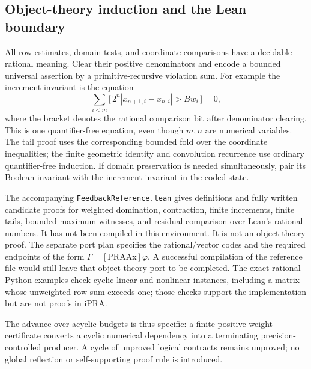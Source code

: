 \subsection{Object-theory induction and the Lean boundary}

All row estimates, domain tests, and coordinate comparisons have a decidable
rational meaning. Clear their positive denominators and encode a bounded
universal assertion by a primitive-recursive violation sum. For example the
increment invariant is the equation
\[
 \sum_{i<m}\bigl[\,2^n|x_{n+1,i}-x_{n,i}|>Bw_i\,\bigr]=0,
\]
where the bracket denotes the rational comparison bit after denominator
clearing. This is one quantifier-free equation, even though $m,n$ are numerical
variables. The tail proof uses the corresponding bounded fold over the
coordinate inequalities; the finite geometric identity and convolution
recurrence use ordinary quantifier-free induction. If domain preservation
is needed simultaneously, pair its Boolean invariant with the increment
invariant in the coded state.

The accompanying \nolinkurl{FeedbackReference.lean} gives definitions and
fully written candidate proofs for weighted domination, contraction, finite
increments, finite tails, bounded-maximum witnesses, and residual comparison
over Lean's rational numbers. It has not been compiled in this environment.
It is not an object-theory proof. The separate port plan specifies the
rational/vector codes and the required endpoints of the form
$\Gamma\vdash[\mathrm{PRAAx}]\varphi$. A successful compilation of the
reference file would still leave that object-theory port to be completed.
The exact-rational Python examples check cyclic linear and nonlinear
instances, including a matrix whose unweighted row sum exceeds one; those
checks support the implementation but are not proofs in iPRA.

The advance over acyclic budgets is thus specific: a finite positive-weight
certificate converts a cyclic numerical dependency into a terminating
precision-controlled producer. A cycle of unproved logical contracts remains
unproved; no global reflection or self-supporting proof rule is introduced.
